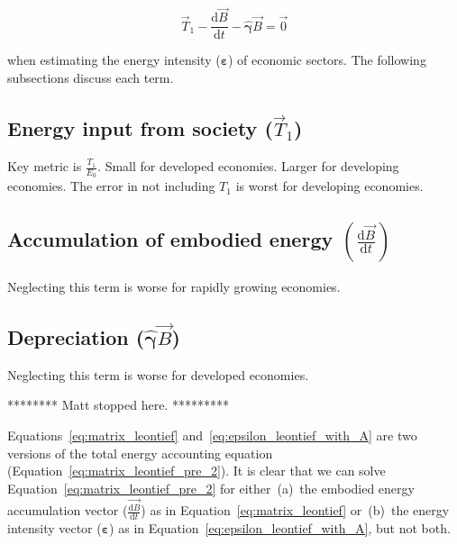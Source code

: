\begin{equation} \label{eq:literature_assumption}
	\vec{T}_{1}
	- \frac{\mathrm{d}\vec{B}}{\mathrm{d}t} 
	- \hat{\bm{\gamma}}\vec{B} 
	= \vec{0}
\end{equation}

\noindent{}when estimating the energy intensity ($\bm{\varepsilon}$) 
of economic sectors. 
The following subsections discuss each term.

\subsection{Energy input from society ($\vec{T}_{1}$)}

Key metric is $\frac{T_1}{E_0}$. 
Small for developed economies. 
Larger for developing economies.
The error in not including $T_1$ is worst for developing economies.


\subsection{Accumulation of embodied energy
$\left( \frac{\mathrm{d}\vec{B}}{\mathrm{d}t} \right)$}

Neglecting this term is worse for rapidly growing economies.



\subsection{Depreciation ($\hat{\bm{\gamma}}\vec{B}$)}

Neglecting this term is worse for developed economies.






******** Matt stopped here. *********

Equations~\ref{eq:matrix_leontief} and~\ref{eq:epsilon_leontief_with_A}
are two versions of the total energy 
accounting equation (Equation~\ref{eq:matrix_leontief_pre_2}).
It is clear that we can solve Equation~\ref{eq:matrix_leontief_pre_2} 
for either~(a)~the embodied energy accumulation
vector ($\vec{\frac{\mathrm{d}B}{\mathrm{d}t}}$) 
as in Equation~\ref{eq:matrix_leontief} 
or~(b)~the energy intensity vector ($\bm{\varepsilon}$) as in
Equation~\ref{eq:epsilon_leontief_with_A}, 
but not both.




